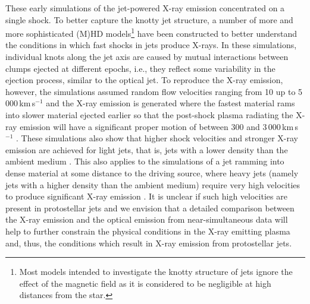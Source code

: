 These early simulations of the jet-powered X-ray emission concentrated on a single shock. To better capture the knotty jet structure, a number of more and more sophisticated (M)HD models\footnote{Most models intended to investigate the knotty structure of jets ignore the effect of the magnetic field as it is considered to be negligible at high distances from the star.} 
have been constructed to better understand the conditions in which fast shocks in jets produce X-rays. 
In these simulations, individual knots along the jet axis are caused by mutual interactions between clumps ejected at different epochs, i.e., they reflect some variability in the ejection process, similar to the optical jet.
To reproduce the X-ray emission, however, the simulations assumed random flow velocities ranging from 10 up to 5\,000\,km\,s$^{-1}$ and the X-ray emission is generated where the fastest material rams into slower material ejected earlier so that the post-shock plasma radiating the X-ray emission will have a significant proper motion of
between 300 and 3\,000\,km\,s$^{-1}$ \cite{Bonito_2010a,Bonito_2010b}.
These simulations also show that higher shock velocities and stronger X-ray emission are achieved for light jets, that is, jets with a lower density than the ambient medium \cite[see also][]{Bonito_2007}. This also applies to the simulations of a jet ramming into dense material at some distance to the driving source, where heavy jets (namely jets with a higher density than the ambient medium) require very high velocities to produce significant X-ray emission  \citep[$\gtrsim1\,000$\,km\,s$^{-1}$, e.g.,][]{Lopez_2015}. It is unclear if such high velocities are present in protostellar jets and we envision that a detailed comparison between the X-ray emission and the optical emission from near-simultaneous data will help to further constrain the physical conditions in the X-ray emitting plasma and, thus, the conditions which result in X-ray emission from protostellar jets.

